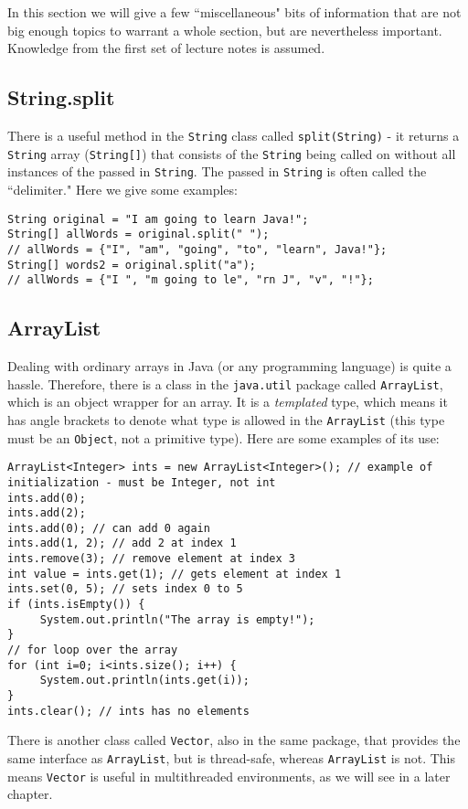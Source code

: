 %
In this section we will give a few ``miscellaneous" bits of information that are not big enough topics to warrant a whole section, but are nevertheless important. Knowledge from the first set of lecture notes is assumed.

\subsection{String.split}
There is a useful method in the \verb|String| class called \verb|split(String)| - it returns a \verb|String| array (\verb|String[]|) that consists of the \verb|String| being called on without all instances of the passed in \verb|String|. The passed in \verb|String| is often called the ``delimiter." Here we give some examples:
\begin{lstlisting}
String original = "I am going to learn Java!";
String[] allWords = original.split(" ");
// allWords = {"I", "am", "going", "to", "learn", Java!"};
String[] words2 = original.split("a");
// allWords = {"I ", "m going to le", "rn J", "v", "!"};
\end{lstlisting}

\subsection{ArrayList}
Dealing with ordinary arrays in Java (or any programming language) is quite a hassle. Therefore, there is a class in the \verb|java.util| package called \verb|ArrayList|, which is an object wrapper for an array. It is a \emph{templated} type, which means it has angle brackets to denote what type is allowed in the \verb|ArrayList| (this type must be an \verb|Object|, not a primitive type). Here are some examples of its use:
\begin{lstlisting}
ArrayList<Integer> ints = new ArrayList<Integer>(); // example of initialization - must be Integer, not int
ints.add(0);
ints.add(2);
ints.add(0); // can add 0 again
ints.add(1, 2); // add 2 at index 1
ints.remove(3); // remove element at index 3
int value = ints.get(1); // gets element at index 1
ints.set(0, 5); // sets index 0 to 5
if (ints.isEmpty()) {
     System.out.println("The array is empty!");
}
// for loop over the array
for (int i=0; i<ints.size(); i++) {
     System.out.println(ints.get(i));
}
ints.clear(); // ints has no elements
\end{lstlisting}
There is another class called \verb|Vector|, also in the same package, that provides the same interface as \verb|ArrayList|, but is thread-safe, whereas \verb|ArrayList| is not. This means \verb|Vector| is useful in multithreaded environments, as we will see in a later chapter.